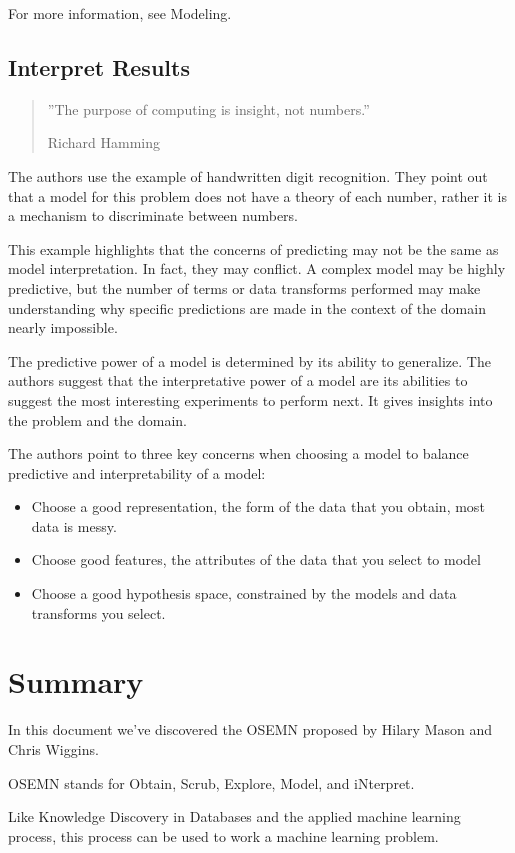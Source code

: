\documentclass[11pt]{article}
\begin{document}
    For more information, see Modeling.

    \subsection{Interpret Results} \label{subsec:interpret}

    \begin{quotation}
        ''The purpose of computing is insight, not numbers.''
        \begin{flushright}
            \textemdash Richard Hamming
        \end{flushright}
    \end{quotation}


    The authors use the example of handwritten digit recognition.
    They point out that a model for this problem does not have a theory of each number, rather it is a mechanism to discriminate between numbers.

    This example highlights that the concerns of predicting may not be the same as model interpretation.
    In fact, they may conflict.
    A complex model may be highly predictive, but the number of terms or data transforms performed may make understanding why specific predictions are made in the context of the domain nearly impossible.

    The predictive power of a model is determined by its ability to generalize.
    The authors suggest that the interpretative power of a model are its abilities to suggest the most interesting experiments to perform next.
    It gives insights into the problem and the domain.

    The authors point to three key concerns when choosing a model to balance predictive and interpretability of a model:

    \begin{itemize}
        \item Choose a good representation, the form of the data that you obtain, most data is messy.
        \item Choose good features, the attributes of the data that you select to model
        \item Choose a good hypothesis space, constrained by the models and data transforms you select.
    \end{itemize}

    \section{Summary} \label{sec:summary}

    In this document we've discovered the OSEMN proposed by Hilary Mason and Chris Wiggins.

    OSEMN stands for Obtain, Scrub, Explore, Model, and iNterpret.

    Like Knowledge Discovery in Databases and the applied machine learning process, this process can be used to work a machine learning problem.

    
    
\end{document}
